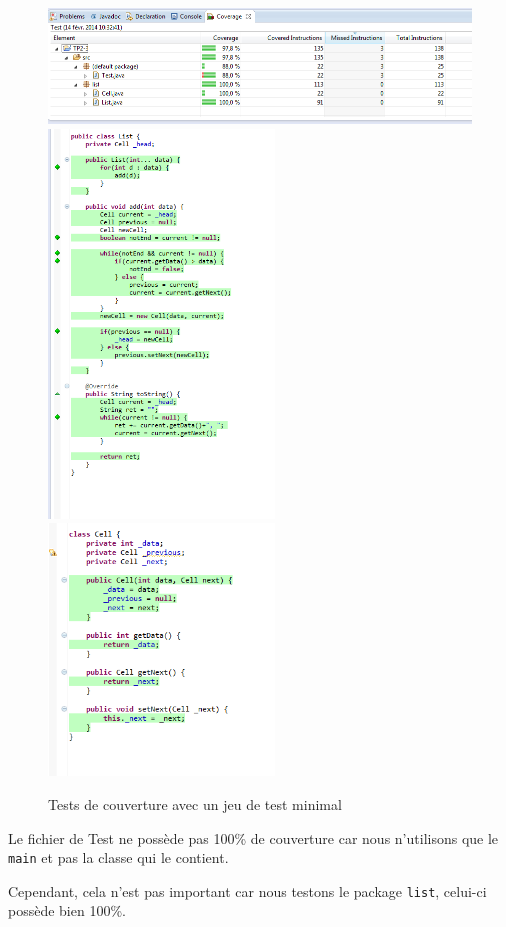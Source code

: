 \documentclass[a4paper, 11pt]{article}
\begin{document}
	\begin{figure}[H]
		\centering
		\includegraphics[width=13cm]{screens/testMin1.png}\\
		\includegraphics[width=6cm]{screens/testMin2.png}
		\includegraphics[width=6cm]{screens/testMin3.png}
		\label{fig:couvmin1}
		\caption{Tests de couverture avec un jeu de test minimal}
	\end{figure}
	\newpage
	\begin{remarque}
		Le fichier de Test ne possède pas 100\% de couverture
		car nous n'utilisons que le \texttt{main} et pas la
		classe qui le contient.

		Cependant, cela n'est pas important car nous testons
		le package \texttt{list}, celui-ci possède bien
		100\%.
	\end{remarque}
\end{document}
